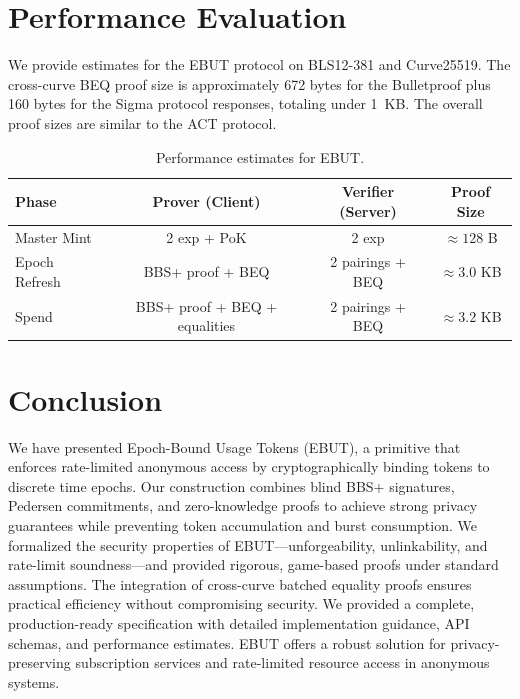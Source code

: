 \documentclass[11pt]{article}
\theoremstyle{definitionstyle}
\theoremstyle{plain}
\begin{document}
\section{Performance Evaluation}

We provide estimates for the EBUT protocol on BLS12-381 and Curve25519. The cross-curve BEQ proof size is approximately 672 bytes for the Bulletproof plus 160 bytes for the Sigma protocol responses, totaling under 1~KB. The overall proof sizes are similar to the ACT protocol.

\begin{table}[h]
\centering
\begin{tabular}{|l|c|c|c|}
\hline
\textbf{Phase} & \textbf{Prover (Client)} & \textbf{Verifier (Server)} & \textbf{Proof Size} \\
\hline
Master Mint & 2 exp + PoK & 2 exp & $\approx 128$ B \\
Epoch Refresh & BBS+ proof + BEQ & 2 pairings + BEQ & $\approx 3.0$ KB \\
Spend & BBS+ proof + BEQ + equalities & 2 pairings + BEQ & $\approx 3.2$ KB \\
\hline
\end{tabular}
\caption{Performance estimates for EBUT.}
\label{tab:performance}
\end{table}

\section{Conclusion}

We have presented Epoch-Bound Usage Tokens (EBUT), a primitive that enforces rate-limited anonymous access by cryptographically binding tokens to discrete time epochs. Our construction combines blind BBS+ signatures, Pedersen commitments, and zero-knowledge proofs to achieve strong privacy guarantees while preventing token accumulation and burst consumption. We formalized the security properties of EBUT—unforgeability, unlinkability, and rate-limit soundness—and provided rigorous, game-based proofs under standard assumptions. The integration of cross-curve batched equality proofs ensures practical efficiency without compromising security. We provided a complete, production-ready specification with detailed implementation guidance, API schemas, and performance estimates. EBUT offers a robust solution for privacy-preserving subscription services and rate-limited resource access in anonymous systems.
\end{document}
